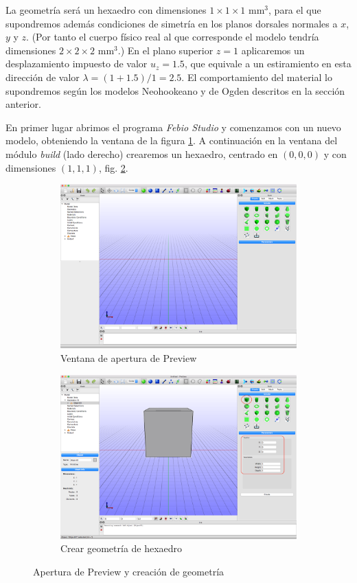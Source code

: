 La geometría será un hexaedro con dimensiones $1\times 1\times 1$ mm$^{3}$, para el que supondremos además condiciones de simetría en los planos dorsales normales a $x$, $y$ y $z$.
(Por tanto el cuerpo físico real al que corresponde el modelo tendría dimensiones $2\times 2\times 2$ mm$^{3}$.)
En el plano superior $z=1$ aplicaremos un desplazamiento impuesto de valor $u_{z}=1.5$, que equivale a un estiramiento en esta dirección de valor $\lambda=(1+1.5)/1=2.5$.
El comportamiento del material lo supondremos según los modelos Neohookeano y de Ogden descritos en la sección anterior.

En primer lugar abrimos el programa \emph{Febio Studio} y comenzamos con un nuevo modelo, obteniendo la ventana de la figura \ref{fig:pre-00}.
A continuación en la ventana del módulo \emph{build} (lado derecho) crearemos un hexaedro, centrado en $(0,0,0)$ y con dimensiones $(1,1,1)$, fig. \ref{fig:pre-01}.
\begin{figure}[!ht]
\centering
\begin{subfigure}[b]{0.48\textwidth}
\includegraphics[width=\linewidth]{figuras_3/scr-pre-00.png}
\caption{Ventana de apertura de Preview}
\label{fig:pre-00}
\end{subfigure}
\begin{subfigure}[b]{0.48\textwidth}
\includegraphics[width=\linewidth]{figuras_3/scr-pre-01m.png}
\caption{Crear geometría de hexaedro}
\label{fig:pre-01}
\end{subfigure}
\caption{Apertura de Preview y creación de geometría}
\label{fig:pre-00-01}
\end{figure}
